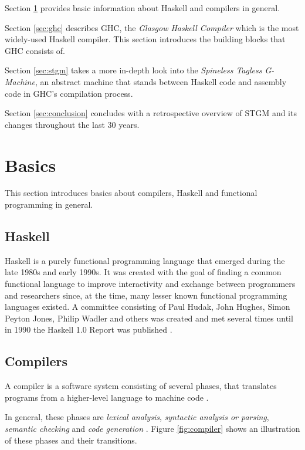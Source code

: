 \documentclass[runningheads]{llncs}
\begin{document}
Section \ref{sec:basics} provides basic information about Haskell and compilers in general.

Section \ref{sec:ghc} describes GHC, the \textit{Glasgow Haskell Compiler} which is the most widely-used Haskell compiler. This section introduces the building blocks that GHC consists of.

Section \ref{sec:stgm} takes a more in-depth look into the \textit{Spineless Tagless G-Machine}, an abstract machine that stands between Haskell code and assembly code in GHC's compilation process.

Section \ref{sec:conclusion} concludes with a retrospective overview of STGM and its changes throughout the last 30 years.


\newpage
\section{Basics}
\label{sec:basics}

This section introduces basics about compilers, Haskell and functional programming in general.

\subsection{Haskell}
Haskell is a purely functional programming language that emerged during the late 1980s and early 1990s. It was created with the goal of finding a common functional language to improve interactivity and exchange between programmers and researchers since, at the time, many lesser known functional programming languages existed. A committee consisting of Paul Hudak, John Hughes, Simon Peyton Jones, Philip Wadler and others was created and met several times until in 1990 the Haskell 1.0 Report was published \cite{hudak2007history}.

\subsection{Compilers}
A compiler is a software system consisting of several phases, that translates programs from a higher-level language to machine code \cite{muchnick1997advanced}.

In general, these phases are \textit{lexical analysis}, \textit{syntactic analysis or parsing}, \textit{semantic checking} and \textit{code generation} \cite{muchnick1997advanced}. Figure \ref{fig:compiler} shows an illustration of these phases and their transitions.
\end{document}
